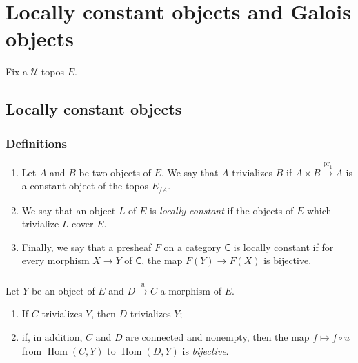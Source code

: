 \documentclass[10pt,oneside]{amsart}
\newcommand{\oldpage}[1]{\marginnote{\textbf{#1}}}
\newcommand{\cal}{\mathcal}
\newcommand{\cat}{\mathsf}
\DeclareMathOperator{\Hom}{Hom}
\DeclareMathOperator{\pr}{pr}
\begin{document}
\section{Locally constant objects and Galois objects}
\oldpage{5}

Fix a $\cal{U}$-topos $E$.

\subsection{Locally constant objects}
\subsubsection{Definitions}
\begin{enumerate}[label=(\arabic*)]
  \item Let $A$ and $B$ be two objects of $E$.
    We say that $A$ trivializes $B$ if $A\times B\xrightarrow{\pr_1}A$ is a constant object of the topos $E_{/A}$.
  \item We say that an object $L$ of $E$ is \emph{locally constant} if the objects of $E$ which trivialize $L$ cover $E$.
  \item Finally, we say that a presheaf $F$ on a category $\cat{C}$ is locally constant if for every morphism $X\to Y$ of $\cat{C}$, the map $F(Y)\to F(X)$ is bijective.
\end{enumerate}

\subsubsection{}
Let $Y$ be an object of $E$ and $D\xrightarrow{u}C$ a morphism of $E$.
\begin{enumerate}[label=(\roman*)]
  \item If $C$ trivializes $Y$, then $D$ trivializes $Y$;
  \item if, in addition, $C$ and $D$ are connected and nonempty, then the map $f\mapsto f\circ u$ from $\Hom(C,Y)$ to $\Hom(D,Y)$ is \emph{bijective}.
\end{enumerate}
\end{document}
